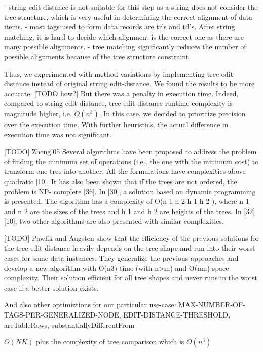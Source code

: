 - string edit distance is not suitable for this step as a string does not consider the tree structure, which is very useful in determining the correct alignment of data items.
- most tags used to form data records are tr’s and td’s. After string matching, it is hard to decide which alignment is the correct one as there are many possible alignments.
- tree matching significantly reduces the number of possible alignments because of the tree structure constraint.

Thus, we experimented with method variations by implementing tree-edit distance instead of original string edit-distance. We found the results to be more accurate. [TODO how?] But there was a penalty in execution time. Indeed, compared to string edit-distance, tree edit-distance runtime complexity is magnitude higher, i.e. $O(n^3)$. In this case, we decided to prioritize precision over the execution time. With further heuristics, the actual difference in execution time was not significant.

[TODO] Zheng'05
Several algorithms have been proposed to address the problem of
finding the minimum set of operations (i.e., the one with the
minimum cost) to transform one tree into another. All the
formulations have complexities above quadratic [10]. It has also
been shown that if the trees are not ordered, the problem is NP-
complete [36]. In [30], a solution based on dynamic programming
is presented. The algorithm has a complexity of O(n 1 n 2 h 1 h 2 ),
where n 1 and n 2 are the sizes of the trees and h 1 and h 2 are heights
of the trees. In [32][10], two other algorithms are also presented
with similar complexities.

[TODO] Pawlik and Augsten \cite{pawlik2011a} show that the efficiency of the previous solutions for the tree edit distance heavily depends on the tree shape and run into their worst cases for some data instances. They generalize the previous approaches and develop a new algorithm with O(n3) time (with n>m) and O(mn) space complexity. Their solution efficient for all tree shapes and never runs in the worst case if a better solution exists.

And also other optimiztions for our particular use-case: MAX-NUMBER-OF-TAGS-PER-GENERALIZED-NODE, EDIT-DISTANCE-THRESHOLD, areTableRows, substantiallyDifferentFrom

$O(N K)$ plus the complexity of tree comparison which is $O(n^3)$


